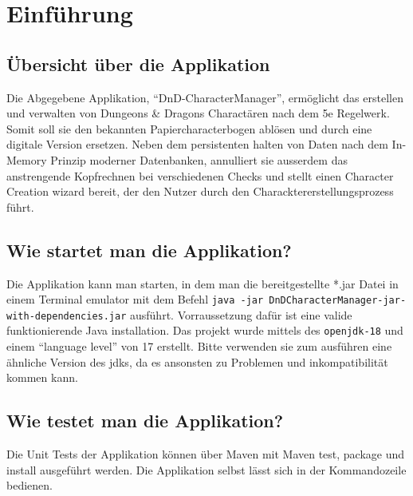 \chapter{Einführung}

\section{Übersicht über die Applikation}
Die Abgegebene Applikation, \enquote{DnD-CharacterManager}, ermöglicht das erstellen und verwalten von Dungeons \& Dragons Charactären nach dem 5e Regelwerk. Somit soll sie den bekannten Papiercharacterbogen ablösen und durch eine digitale Version ersetzen. Neben dem persistenten halten von Daten nach dem In-Memory Prinzip moderner Datenbanken, annulliert sie ausserdem das anstrengende Kopfrechnen bei verschiedenen Checks und stellt einen Character Creation wizard bereit, der den Nutzer durch den Characktererstellungsprozess führt.

\section{Wie startet man die Applikation?}
Die Applikation kann man starten, in dem man die bereitgestellte *.jar Datei in einem Terminal emulator mit dem Befehl
\texttt{java -jar DnDCharacterManager-jar-with-dependencies.jar} ausführt. Vorraussetzung dafür ist eine valide funktionierende Java installation. Das projekt wurde mittels des \texttt{openjdk-18} und einem \enquote{language level} von 17 erstellt. Bitte verwenden sie zum ausführen eine ähnliche Version des jdks, da es ansonsten zu Problemen und inkompatibilität kommen kann.

\section{Wie testet man die Applikation?}
Die Unit Tests der Applikation können über Maven mit Maven test, package und install ausgeführt werden. Die Applikation selbst lässt sich in der Kommandozeile bedienen.
